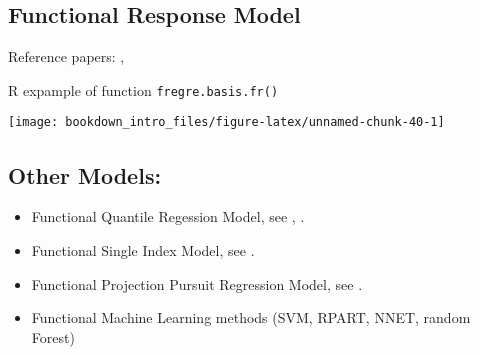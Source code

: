 \documentclass[
]{book}
\newenvironment{Shaded}{\begin{snugshade}}{\end{snugshade}}
\newcommand{\AttributeTok}[1]{\textcolor[rgb]{0.77,0.63,0.00}{#1}}
\newcommand{\DecValTok}[1]{\textcolor[rgb]{0.00,0.00,0.81}{#1}}
\newcommand{\FunctionTok}[1]{\textcolor[rgb]{0.00,0.00,0.00}{#1}}
\newcommand{\NormalTok}[1]{#1}
\newcommand{\OtherTok}[1]{\textcolor[rgb]{0.56,0.35,0.01}{#1}}
\newcommand{\SpecialCharTok}[1]{\textcolor[rgb]{0.00,0.00,0.00}{#1}}
\newcommand{\StringTok}[1]{\textcolor[rgb]{0.31,0.60,0.02}{#1}}
\providecommand{\tightlist}{%
  \setlength{\itemsep}{0pt}\setlength{\parskip}{0pt}}
\begin{document}
\hypertarget{functional-response-model}{%
\subsection{Functional Response Model}\label{functional-response-model}}

Reference papers: \citet{faraway1997regression}, \citet{ferraty2012regression}

R expample of function \texttt{fregre.basis.fr()}

\begin{Shaded}
\end{Shaded}

\begin{center}\texttt{[image: bookdown\_intro\_files/figure-latex/unnamed-chunk-40-1]} \end{center}

\hypertarget{other-models}{%
\subsection{Other Models:}\label{other-models}}

\begin{itemize}
\tightlist
\item
  Functional Quantile Regession Model, see \citet{kato2012estimation}, \citet{cardot2005quantile}.
\item
  Functional Single Index Model, see \citet{ferraty2011estimation}.
\item
  Functional Projection Pursuit Regression Model, see \citet{ferraty2013functional}.
\item
  Functional Machine Learning methods (SVM, RPART, NNET, random Forest)
\end{itemize}
\end{document}
